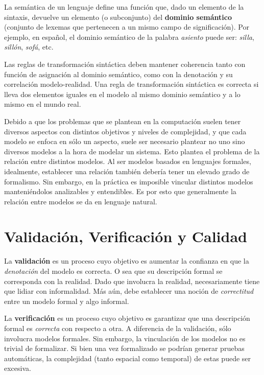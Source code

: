 \documentclass[]{article}
\begin{document}
La semántica de un lenguaje define una función que, dado un elemento de la sintaxis, devuelve un elemento (o subconjunto) del \textbf{dominio semántico} (conjunto de lexemas que pertenecen a un mismo campo de significación). Por ejemplo, en español, el dominio semántico de la palabra \textit{asiento} puede ser: \textit{silla}, \textit{sillón}, \textit{sofá}, etc.

Las reglas de transformación sintáctica deben mantener coherencia tanto con función de asignación al dominio semántico, como con la denotación y su correlación modelo-realidad. Una regla de transformación sintáctica es correcta si lleva dos elementos iguales en el modelo al mismo dominio semántico y a lo mismo en el mundo real.

Debido a que los problemas que se plantean en la computación suelen tener diversos aspectos con distintos objetivos y niveles de complejidad, y que cada modelo se enfoca en sólo un aspecto, suele ser necesario plantear no uno sino diversos modelos a la hora de modelar un sistema. Esto plantea el problema de la relación entre distintos modelos. Al ser modelos basados en lenguajes formales, idealmente, establecer una relación también debería tener un elevado grado de formalismo. Sin embargo, en la práctica es imposible vincular distintos modelos manteniéndolos analizables y entendibles. Es por esto que generalmente la relación entre modelos se da en lenguaje natural.

\newpage

\section{Validación, Verificación y Calidad}
La \textbf{validación} es un proceso cuyo objetivo es aumentar la confianza en que la \textit{denotación} del modelo es correcta. O sea que su descripción formal se corresponda con la realidad. Dado que involucra la realidad, necesariamente tiene que lidiar con informalidad. Más aún, debe establecer una noción de \textit{correctitud} entre un modelo formal y algo informal.

La \textbf{verificación} es un proceso cuyo objetivo es garantizar que una descripción formal es \textit{correcta} con respecto a otra. A diferencia de la validación, sólo involucra modelos formales. Sin embargo, la vinculación de los modelos no es trivial de formalizar. Si bien una vez formalizado se podrían generar pruebas automáticas, la complejidad (tanto espacial como temporal) de estas puede ser excesiva.
\end{document}
